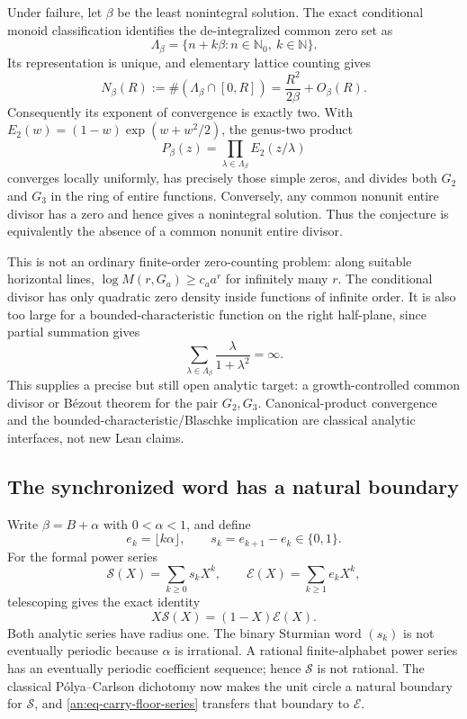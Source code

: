 \documentclass[11pt,oneside]{article}
\theoremstyle{definition}
\theoremstyle{remark}
\newcommand{\N}{\mathbb N}
\newcommand{\Nzero}{\mathbb N_0}
\begin{document}
Under failure, let $\beta$ be the least nonintegral solution.  The exact conditional monoid
classification identifies the de-integralized common zero set as
\[
 \Lambda_\beta=\{n+k\beta:n\in\Nzero,\ k\in\N\}.
\]
Its representation is unique, and elementary lattice counting gives
\begin{equation}
 N_\beta(R):=\#(\Lambda_\beta\cap[0,R])
 =\frac{R^2}{2\beta}+O_\beta(R).
 \label{an:eq-quadratic-zero-count}
\end{equation}
Consequently its exponent of convergence is exactly two.  With
$E_2(w)=(1-w)\exp(w+w^2/2)$, the genus-two product
\begin{equation}
 P_\beta(z)=\prod_{\lambda\in\Lambda_\beta}E_2(z/\lambda)
 \label{an:eq-canonical-product}
\end{equation}
converges locally uniformly, has precisely those simple zeros, and divides both $G_2$ and
$G_3$ in the ring of entire functions.  Conversely, any common nonunit entire divisor has a
zero and hence gives a nonintegral solution.  Thus the conjecture is equivalently the absence
of a common nonunit entire divisor.

This is not an ordinary finite-order zero-counting problem: along suitable horizontal lines,
$\log M(r,G_a)\ge c_a a^r$ for infinitely many $r$.  The conditional divisor has only
quadratic zero density inside functions of infinite order.  It is also too large for a
bounded-characteristic function on the right half-plane, since partial summation gives
\begin{equation}
 \sum_{\lambda\in\Lambda_\beta}\frac{\lambda}{1+\lambda^2}=\infty.
 \label{an:eq-blaschke-divergence}
\end{equation}
This supplies a precise but still open analytic target: a growth-controlled common divisor or
B\'ezout theorem for the pair $G_2,G_3$.  Canonical-product convergence and the
bounded-characteristic/Blaschke implication are classical analytic interfaces, not new Lean
claims.

\subsection{The synchronized word has a natural boundary}
\label{an:natural-boundary}

Write $\beta=B+\alpha$ with $0<\alpha<1$, and define
\[
 e_k=\lfloor k\alpha\rfloor,\qquad s_k=e_{k+1}-e_k\in\{0,1\}.
\]
For the formal power series
\[
 \mathcal S(X)=\sum_{k\ge0}s_kX^k,\qquad
 \mathcal E(X)=\sum_{k\ge1}e_kX^k,
\]
telescoping gives the exact identity
\begin{equation}
 X\mathcal S(X)=(1-X)\mathcal E(X).
 \label{an:eq-carry-floor-series}
\end{equation}
Both analytic series have radius one.  The binary Sturmian word $(s_k)$ is not eventually
periodic because $\alpha$ is irrational.  A rational finite-alphabet power series has an
eventually periodic coefficient sequence; hence $\mathcal S$ is not rational.  The classical
P\'olya--Carlson dichotomy now makes the unit circle a natural boundary for $\mathcal S$, and
\eqref{an:eq-carry-floor-series} transfers that boundary to $\mathcal E$.
\end{document}
